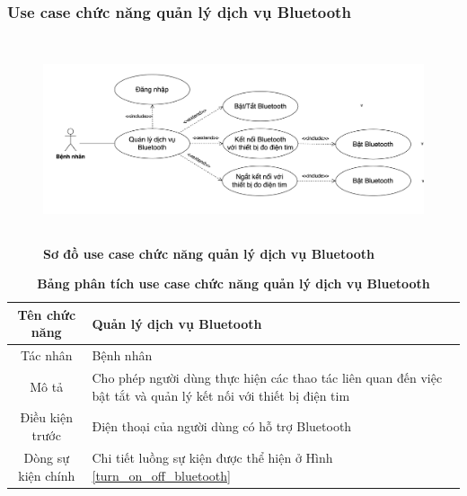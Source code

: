 \subsubsection{Use case chức năng quản lý dịch vụ Bluetooth}
  \begin{figure}[H]
    \centering
    \includegraphics[width=15cm,height=6cm]{Images/use_case/use_case_bluetooth.png}
    \caption[Sơ đồ use case chức năng quản lý dịch vụ Bluetooth]{\bfseries \fontsize{12pt}{0pt}
    \selectfont Sơ đồ use case chức năng quản lý dịch vụ Bluetooth}
    \label{use_case_bluetooth} %
  \end{figure}

  \begin{table}[H]
    \caption{\bfseries \fontsize{12pt}{0pt}\selectfont Bảng phân tích use case chức năng quản lý dịch vụ Bluetooth}
    \centering
    \begin{tabularx}{0.9\textwidth}{|c|X|}
      \hline
      \textbf{Tên chức năng} & \textbf{Quản lý dịch vụ Bluetooth} \\
      \hline
      Tác nhân & Bệnh nhân \\
      \hline
      Mô tả & Cho phép người dùng thực hiện các thao tác liên quan đến việc bật tắt và quản lý kết nối với thiết bị điện tim \\
      \hline
      Điều kiện trước & Điện thoại của người dùng có hỗ trợ Bluetooth \\
      \hline
      Dòng sự kiện chính & 
        Chi tiết luồng sự kiện được thể hiện ở Hình \ref{turn_on_off_bluetooth} \\
      \hline
    \end{tabularx}
  \end{table}

